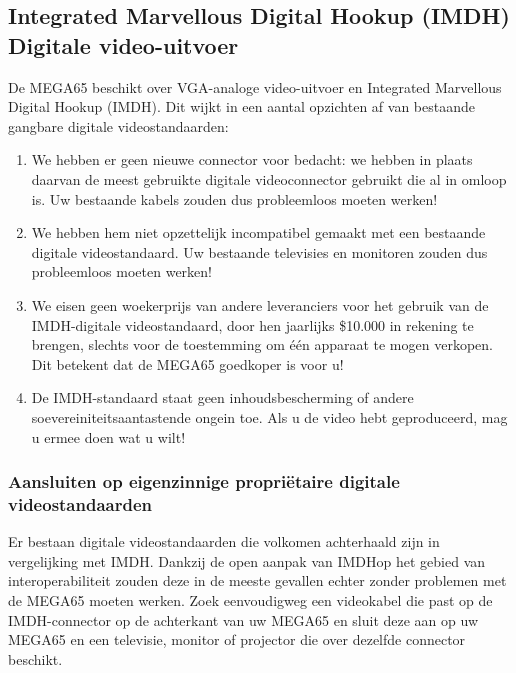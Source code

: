  \subsection{Integrated Marvellous Digital Hookup\texttrademark{} (IMDH\texttrademark{})  Digitale video-uitvoer}

De MEGA65 beschikt over VGA-analoge video-uitvoer en Integrated Marvellous Digital Hookup\texttrademark{} (IMDH\texttrademark{}). Dit wijkt in een aantal opzichten af van bestaande gangbare digitale videostandaarden:

\begin{enumerate}
  \item We hebben er geen nieuwe connector voor bedacht: we hebben in plaats daarvan de meest gebruikte digitale videoconnector gebruikt die al in omloop is. Uw bestaande kabels zouden dus probleemloos moeten werken!  \item We hebben hem niet opzettelijk incompatibel gemaakt met een bestaande digitale videostandaard. Uw bestaande televisies en monitoren zouden dus probleemloos moeten werken!  \item We eisen geen woekerprijs van andere leveranciers voor het gebruik van de IMDH\texttrademark{}-digitale videostandaard, door hen jaarlijks \$10.000 in rekening te brengen, slechts voor de toestemming om één apparaat te mogen verkopen. Dit betekent dat de MEGA65 goedkoper is voor u!  \item De IMDH\texttrademark{}-standaard staat geen inhoudsbescherming of andere soevereiniteitsaantastende ongein toe. Als u de video hebt geproduceerd, mag u ermee doen wat u wilt!
\end{enumerate}

\subsubsection{Aansluiten op eigenzinnige propriëtaire digitale videostandaarden}

Er bestaan digitale videostandaarden die volkomen achterhaald zijn in vergelijking met IMDH\texttrademark. Dankzij de open aanpak van IMDH\texttrademark op het gebied van interoperabiliteit zouden deze in de meeste gevallen echter zonder problemen met de MEGA65 moeten werken. Zoek eenvoudigweg een videokabel die past op de IMDH\texttrademark{}-connector op de achterkant van uw MEGA65 en sluit deze aan op uw MEGA65 en een televisie, monitor of projector die over dezelfde connector beschikt.

